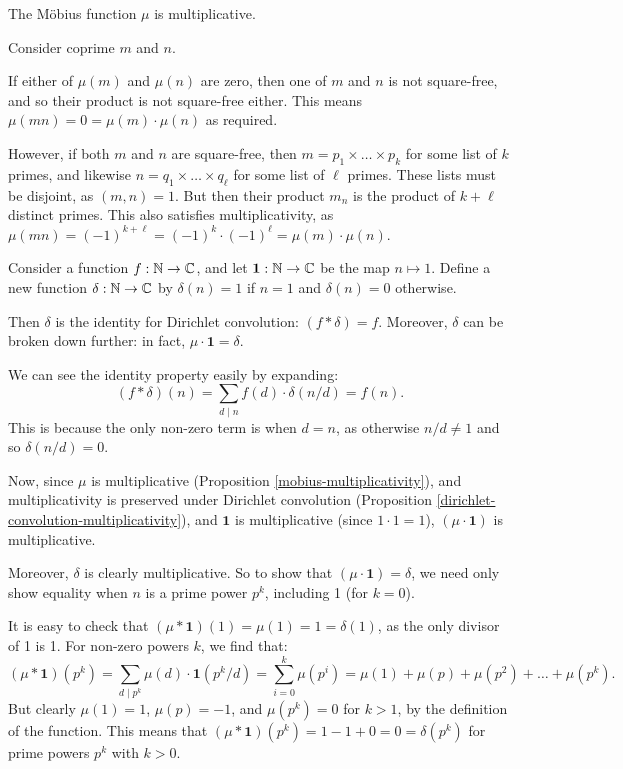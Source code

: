 \documentclass{article}
\begin{document}
\begin{proposition}[Multiplicativity]
	\label{mobius-multiplicativity}
    The M\"obius function $\mu$ is multiplicative.
\end{proposition}

\begin{prf}
	Consider coprime $m$ and $n$.
	
	If either of $\mu(m)$ and $\mu(n)$ are zero, then one of $m$ and $n$ is not square-free, and so their product is not square-free either. This means $\mu(mn) = 0 = \mu(m) \cdot \mu(n)$ as required.
	
	However, if both $m$ and $n$ are square-free, then $m = p_1 \times \dots \times p_k$ for some list of $k$ primes, and likewise $n = q_1 \times \dots \times q_\ell$ for some list of $\ell$ primes. These lists must be disjoint, as $(m, n) = 1$. But then their product $m_n$ is the product of $k + \ell$ distinct primes. This also satisfies multiplicativity, as $\mu(mn) = (-1)^{k + \ell} = (-1)^k \cdot (-1)^\ell = \mu(m) \cdot \mu(n)$.
\end{prf}


\begin{proposition}
    Consider a function $f : \mathbb{N} \to \mathbb{C}$, and let $\mathbf{1} : \mathbb{N} \to \mathbb{C}$ be the map $n \mapsto 1$. Define a new function $\delta : \mathbb{N} \to \mathbb{C}$ by $\delta(n) = 1$ if $n = 1$ and $\delta(n) = 0$ otherwise.
    
    Then $\delta$ is the identity for Dirichlet convolution: $(f * \delta) = f$. Moreover, $\delta$ can be broken down further: in fact, $\mu \cdot \mathbf{1} = \delta$.
\end{proposition}

\begin{prf}
    We can see the identity property easily by expanding:
    \[
	(f * \delta)(n) = \sum_{d \mid n} f(d) \cdot \delta(n/d) = f(n).
	\]
	This is because the only non-zero term is when $d = n$, as otherwise $n/d \neq 1$ and so $\delta(n/d) = 0$.
	
	Now, since $\mu$ is multiplicative (Proposition \ref{mobius-multiplicativity}), and multiplicativity is preserved under Dirichlet convolution (Proposition \ref{dirichlet-convolution-multiplicativity}), and $\mathbf{1}$ is multiplicative (since $1 \cdot 1 = 1$), $(\mu \cdot \mathbf{1})$ is multiplicative.
	
	Moreover, $\delta$ is clearly multiplicative.
	So to show that $(\mu \cdot \mathbf{1}) = \delta$, we need only show equality when $n$ is a prime power $p^k$, including 1 (for $k = 0$).
	
	It is easy to check that $(\mu * \mathbf{1})(1) = \mu(1) = 1 = \delta(1)$, as the only divisor of 1 is 1. For non-zero powers $k$, we find that:
	\[
	(\mu * \mathbf{1})(p^k) = \sum_{d \mid p^k} \mu(d) \cdot \mathbf{1}(p^k/d) =
	\sum_{i=0}^k \mu(p^i) = \mu(1) + \mu(p) + \mu(p^2) + \dots + \mu(p^k).
	\]
	But clearly $\mu(1) = 1$, $\mu(p) = -1$, and $\mu(p^k) = 0$ for $k > 1$, by the definition of the function. This means that $(\mu * \mathbf{1})(p^k) = 1 - 1 + 0 = 0 = \delta(p^k)$ for prime powers $p^k$ with $k > 0$.
\end{prf}
\end{document}
